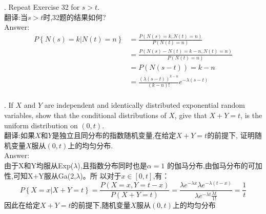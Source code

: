 \documentclass{book}
\begin{document}
. Repeat Exercise 32 for $s > t$.\\
\noindent
翻译:当$s > t$时,32题的结果如何?\\
\noindent
Answer:
\begin{align*}
    P\left\{N(s)=k|N(t)=n\right\}
     & = \frac{P(N(s)=k,N(t)=n)}{P(N(t)=n)}                      \\
     & = \frac{P(N(s)-N(t)=k-n,N(t)=n)}{P(N(t)=n)}               \\
     & = P(N(s-t))=k-n                                           \\
     & = \frac{(\lambda (s-t))^{k-n}}{(k-n)!} e^{-\lambda (s-t)} \\
\end{align*}

. If $X$ and $Y$ are independent and identically distributed
exponential random variables, show that the conditional
distributions of $X$, give that $X+Y=t$, is the uniform
distribution on $(0,t)$.\\
\noindent
翻译:如果$X$和$Y$是独立且同分布的指数随机变量,在给定$X+Y=t$的前提下,
证明随机变量$X$服从$(0,t)$上的均匀分布.\\
\noindent
Answer: \\
由于X和Y均服从Exp($\lambda$),且指数分布同时也是$\alpha = 1$
的伽马分布,由伽马分布的可加性,可知X+Y服从Ga(2,$\lambda$)。所
以对于$x\in[0,t]$,有：
$$
    P\left\{X=x|X+Y=t\right\} = \frac{P(X=x,Y=t-x)}{P(X+Y=t)}
    = \frac{\lambda e^{-\lambda x} \lambda e^{-\lambda (t-x)}}
    {\lambda e^{-\lambda t} \frac{\lambda t}{1!}} = \frac{1}{t}
$$
因此在给定$X+Y=t$的前提下,随机变量$X$服从$(0,t)$上的均匀分布
\end{document}
